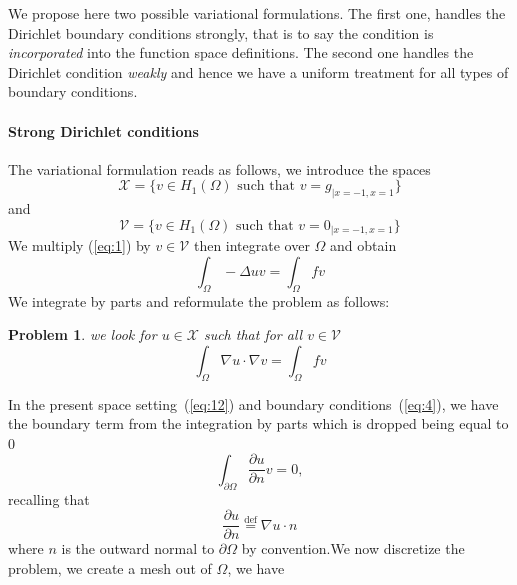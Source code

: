 \documentclass[a4paper]{book}
\newtheorem{problem}{Problem}
\begin{document}
We propose here two possible variational formulations. The first one,
handles the Dirichlet boundary conditions strongly, that is to say the
condition is \emph{incorporated} into the function space definitions.
The second one handles the Dirichlet condition \emph{weakly} and hence
we have a uniform treatment for all types of boundary conditions.



\paragraph{Strong Dirichlet conditions}
\label{sec:strong-dirichl-cond}

\noindent
The variational formulation reads as follows, we introduce the spaces
\begin{equation}
  \label{eq:11}
  \mathcal{X} = \Big\{ v \in H_1(\Omega) \text{ such that } v=g_{|x=-1,x=1} \Big\}
\end{equation}
and
\begin{equation}
  \label{eq:12}
  \mathcal{V} = \Big\{ v \in H_1(\Omega) \text{ such that } v=0_{|x=-1,x=1} \Big\}
\end{equation}
We multiply (\ref{eq:1}) by $v \in \mathcal{V}$ then integrate over $\Omega$ and obtain
\begin{equation}
  \label{eq:13}
  \int_\Omega -\Delta u v = \int_\Omega f v
\end{equation}
We integrate by parts and reformulate the problem as follows:
\begin{problem}
we look
for $u \in \mathcal{X}$ such that for all $v \in \mathcal{V}$
\begin{equation}
  \label{eq:14}
  \int_\Omega \nabla u \cdot \nabla v  = \int_\Omega f v
\end{equation}

\end{problem}
In the present space setting~(\ref{eq:12}) and boundary
conditions~(\ref{eq:4}), we have the boundary term from the integration by
parts which is dropped being equal to 0
\begin{equation}
  \label{eq:15}
  \int_{\partial \Omega} \frac{\partial u}{\partial n} v = 0,
\end{equation}
recalling that
\begin{equation}
  \label{eq:21}
  \frac{\partial u}{\partial n} \stackrel{\text{def}}{=} \nabla u \cdot n
\end{equation}
where $n$ is the outward normal to $\partial \Omega$ by convention.We
now discretize the problem, we create a mesh out of $\Omega$, we have
\end{document}
